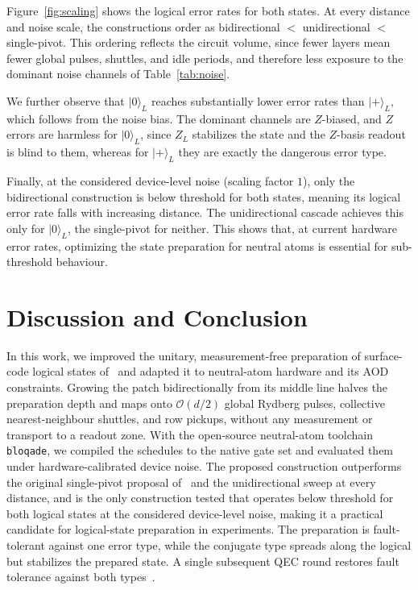 \documentclass[conference]{IEEEtran}
\newcommand{\ket}[1]{\lvert #1 \rangle}
\newcommand{\zerol}{\ket{0}_L}
\newcommand{\plusl}{\ket{+}_L}
\newcommand{\bigo}[1]{\mathcal{O}(#1)}
\begin{document}
Figure~\ref{fig:scaling} shows the logical error rates for both states. At every distance and noise scale, the constructions order as
bidirectional $<$ unidirectional $<$ single-pivot. This ordering reflects
the circuit volume, since fewer layers mean fewer global
pulses, shuttles, and idle periods, and therefore less exposure to the
dominant noise channels of Table~\ref{tab:noise}.

We further observe that $\zerol$ reaches substantially lower error rates
than $\plusl$, which follows from the noise bias. The dominant channels are
$Z$-biased, and $Z$ errors are harmless for $\zerol$, since $Z_L$ stabilizes
the state and the $Z$-basis readout is blind to them, whereas for $\plusl$
they are exactly the dangerous error type.

Finally, at the considered device-level noise (scaling factor $1$), only
the bidirectional construction is below threshold for both states, meaning
its logical error rate falls with increasing distance. The unidirectional
cascade achieves this only for $\zerol$, the single-pivot for neither. This
shows that, at current hardware error rates, optimizing
the state preparation for neutral atoms is essential for sub-threshold
behaviour.

\section{Discussion and Conclusion}\label{sec:discussion}

In this work, we improved the unitary, measurement-free preparation of
surface-code logical states of~\cite{ref:unitaryprep} and adapted it to
neutral-atom hardware and its AOD constraints. Growing the patch
bidirectionally from its middle line halves the preparation depth and maps
onto $\bigo{d/2}$ global Rydberg pulses, collective nearest-neighbour
shuttles, and row pickups, without any measurement or transport to a readout
zone. With the open-source neutral-atom toolchain
\texttt{bloqade}, we compiled the schedules to the native gate set and
evaluated them under hardware-calibrated device noise. The proposed
construction outperforms the original single-pivot proposal
of~\cite{ref:unitaryprep} and the unidirectional sweep at every distance,
and is the only construction tested that operates below threshold for both
logical states at the considered device-level noise, making it a practical
candidate for logical-state preparation in experiments.
The preparation is fault-tolerant against one error type, while the
conjugate type spreads along the logical but stabilizes the prepared state.
A single subsequent QEC round restores fault tolerance against both
types~\cite{ref:unitaryprep}.
\end{document}
